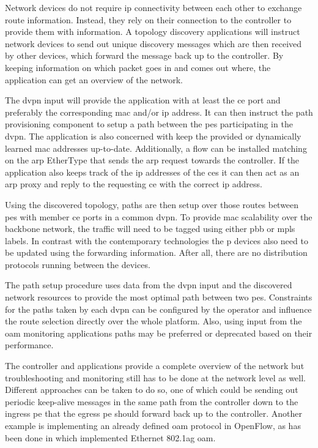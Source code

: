 \begin{description}[leftmargin=!,labelwidth=\widthof{\bfseries Topology Discovery}]
	\item[Topology Discovery] Network devices do not require \ac{ip} connectivity between each other to exchange route information. Instead, they rely on their connection to the controller to provide them with information. A topology discovery applications will instruct network devices to send out unique discovery messages which are then received by other devices, which forward the message back up to the controller. By keeping information on which packet goes in and comes out where, the application can get an overview of the network.
	\item[\ac{dvpn} Provisioning] The \ac{dvpn} input will provide the application with at least the \ac{ce} port and preferably the corresponding \ac{mac} and/or \ac{ip} address. It can then instruct the path provisioning component to setup a path between the \acp{pe} participating in the \ac{dvpn}. The application is also concerned with keep the provided or dynamically learned \ac{mac} addresses up-to-date. Additionally, a flow can be installed matching on the \ac{arp} EtherType that sends the \ac{arp} request towards the controller. If the application also keeps track of the \ac{ip} addresses of the \acp{ce} it can then act as an \ac{arp} proxy and reply to the requesting \ac{ce} with the correct \ac{ip} address.
	\item[Path Provisioning] Using the discovered topology, paths are then setup over those routes between \acp{pe} with member \ac{ce} ports in a common \ac{dvpn}. To provide \ac{mac} scalability over the backbone network, the traffic will need to be tagged using either \ac{pbb} or \ac{mpls} labels. In contrast with the contemporary technologies the \ac{p} devices also need to be updated using the forwarding information. After all, there are no distribution protocols running between the devices.
	\item[Traffic Engineering] The path setup procedure uses data from the \ac{dvpn} input and the discovered network resources to provide the most optimal path between two \acp{pe}. Constraints for the paths taken by each \ac{dvpn} can be configured by the operator and influence the route selection directly over the whole platform. Also, using input from the \ac{oam} monitoring applications paths may be preferred or deprecated based on their performance.
	\item[\acs{oam}] The controller and applications provide a complete overview of the network but troubleshooting and monitoring still has to be done at the network level as well. Different approaches can be taken to do so, one of which could be sending out periodic keep-alive messages in the same path from the controller down to the ingress \ac{pe} that the egress \ac{pe} should forward back up to the controller. Another example is implementing an already defined \ac{oam} protocol in OpenFlow, as has been done in \cite{of-oam} which implemented Ethernet 802.1ag \ac{oam}.
\end{description}

